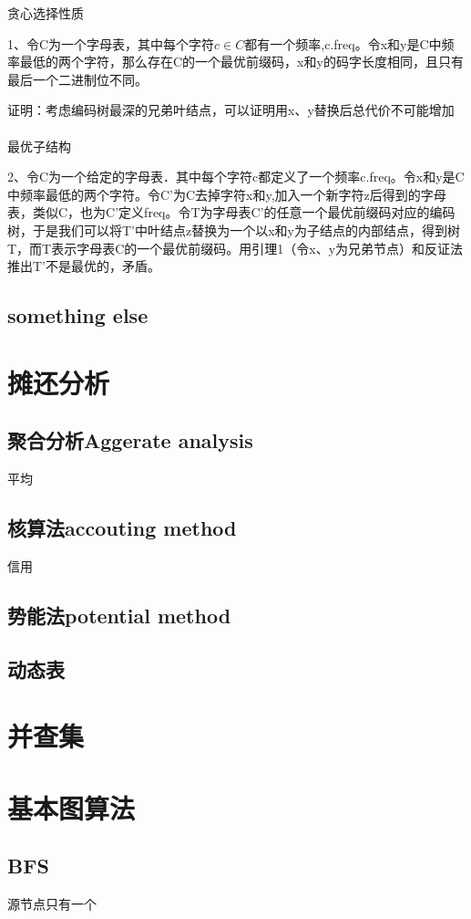 \documentclass[cn,hazy,blue,screen,14pt]{note}
\begin{document}
贪心选择性质

1、令C为一个字母表，其中每个字符$c\in C$都有一个频率,c.freq。令x和y是C中频率最低的两个字符，那么存在C的一个最优前缀码，x和y的码字长度相同，且只有最后一个二进制位不同。

证明：考虑编码树最深的兄弟叶结点，可以证明用x、y替换后总代价不可能增加\\\\

最优子结构

2、令C为一个给定的字母表．其中每个字符c都定义了一个频率c.freq。令x和y是C中频率最低的两个字符。令C'为C去掉字符x和y,加入一个新字符z后得到的字母表，类似C，也为C'定义freq。令T为字母表C'的任意一个最优前缀码对应的编码树，于是我们可以将T'中叶结点z替换为一个以x和y为子结点的内部结点，得到树T，而T表示字母表C的一个最优前缀码。用引理1（令x、y为兄弟节点）和反证法推出T'不是最优的，矛盾。

\subsection{something else}


\newpage
\section{摊还分析}
\subsection{聚合分析Aggerate analysis}
平均
\subsection{核算法accouting method}
信用
\subsection{势能法potential method}
\subsection{动态表}

\newpage
\section{并查集}


\newpage
\section{基本图算法}
\subsection{BFS}
源节点只有一个
\end{document}
